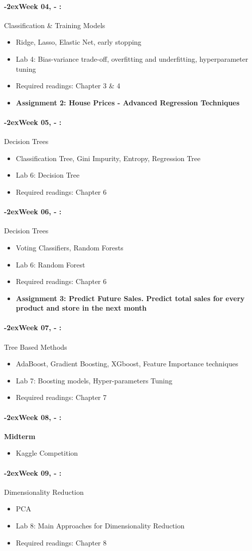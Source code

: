 \documentclass[11pt]{article}
\newcommand{\week}[1]{%
  \paragraph*{\kern-2ex\quad #1, \syldate{\today} - \AdvanceDate[4]\syldate{\today}:}%
  \ifdim\wd1=\wd\MONDAY
    \AdvanceDate[7]
  \else
    \AdvanceDate[7]
  \fi%
}
\begin{document}
\week{Week 04} Classification {\&} Training Models
\begin{itemize}
\item Ridge, Lasso, Elastic Net, early stopping
\item Lab 4: Bias-variance trade-off, overfitting and underfitting, hyperparameter tuning
\item Required readings: Chapter 3 {\&} 4
\item \textbf{Assignment 2: House Prices - Advanced Regression Techniques}
\end{itemize}

\week{Week 05} Decision Trees
\begin{itemize}
\item Classification Tree, Gini Impurity, Entropy, Regression Tree
\item Lab 6: Decision Tree
\item Required readings: Chapter 6
\end{itemize}

\week{Week 06} Decision Trees
\begin{itemize}
\item Voting Classifiers, Random Forests 
\item Lab 6: Random Forest
\item Required readings: Chapter 6
\item \textbf{Assignment 3: Predict Future Sales. Predict total sales for every product and store in the next month}
\end{itemize}

\week{Week 07} Tree Based Methods
\begin{itemize}
\item AdaBoost, Gradient Boosting, XGboost, Feature Importance techniques
\item Lab 7: Boosting models, Hyper-parameters Tuning 
\item Required readings: Chapter 7

\end{itemize}

\week{Week 08} \textbf{Midterm}
\begin{itemize}
\item Kaggle Competition
\end{itemize}

\week{Week 09} Dimensionality Reduction
\begin{itemize}
\item PCA
\item Lab 8: Main Approaches for Dimensionality Reduction
\item Required readings: Chapter 8
\end{itemize}
\end{document}
